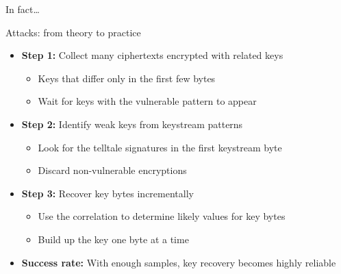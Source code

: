 \documentclass[aspectratio=169, lualatex, handout]{beamer}
\begin{document}
\begin{frame}{In fact\ldots}
\end{frame}

\begin{frame}{Attacks: from theory to practice}
	\begin{itemize}
		\item \textbf{Step 1:} Collect many ciphertexts encrypted with related keys
		      \begin{itemize}
			      \item Keys that differ only in the first few bytes
			      \item Wait for keys with the vulnerable pattern to appear
		      \end{itemize}
		\item \textbf{Step 2:} Identify weak keys from keystream patterns
		      \begin{itemize}
			      \item Look for the telltale signatures in the first keystream byte
			      \item Discard non-vulnerable encryptions
		      \end{itemize}
		\item \textbf{Step 3:} Recover key bytes incrementally
		      \begin{itemize}
			      \item Use the correlation to determine likely values for key bytes
			      \item Build up the key one byte at a time
		      \end{itemize}
		\item \textbf{Success rate:} With enough samples, key recovery becomes highly reliable
	\end{itemize}
\end{frame}
\end{document}
